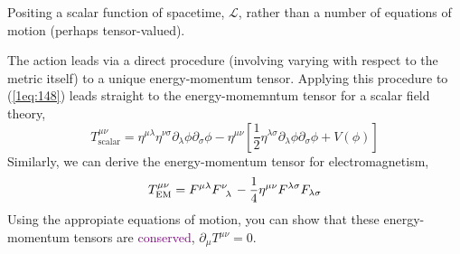 Positing a scalar function of spacetime, $\mathcal{L}$, rather than a number of equations of motion (perhaps tensor-valued).

The action leads via a direct procedure (involving varying with respect to the metric itself) to a unique energy-momentum tensor. Applying this procedure to (\ref{1eq:148}) leads straight to the energy-momemntum tensor for a scalar field theory,
\begin{equation*}
    T^{\mu\nu}_{\text{scalar}}=\eta^{\mu\lambda}\eta^{\nu\sigma}\partial_\lambda\phi\partial_\sigma\phi-\eta^{\mu\nu}\left[\frac{1}{2}\eta^{\lambda\sigma}\partial_\lambda\phi\partial_\sigma\phi+V(\phi)\right]
\end{equation*}
Similarly, we can derive the energy-momentum tensor for electromagnetism,
\begin{equation*}
    T^{\mu\nu}_{\text{EM}}=F^{\mu\lambda}\tensor{F}{^\nu_\lambda}-\frac{1}{4}\eta^{\mu\nu}F^{\lambda\sigma}F_{\lambda\sigma}
\end{equation*}
Using the appropiate equations of motion, you can show that these energy-momentum tensors are \textcolor{purple}{conserved}, $\partial_\mu T^{\mu\nu}=0$.